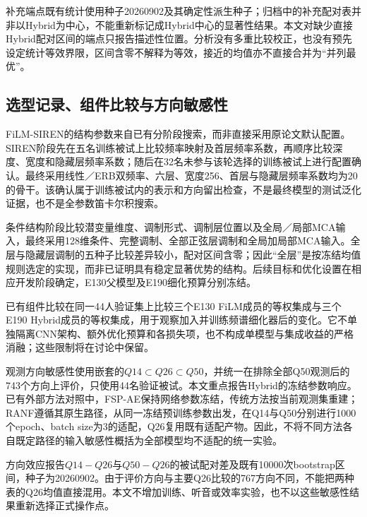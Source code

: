 补充端点既有统计使用种子20260902及其确定性派生种子；归档中的补充配对表并非以Hybrid为中心，不能重新标记成Hybrid中心的显著性结果。本文对缺少直接Hybrid配对区间的端点只报告描述性位置。分析没有多重比较校正，也没有预先设定统计等效界限，区间含零不解释为等效，接近的均值亦不直接合并为“并列最优”。

\subsection{选型记录、组件比较与方向敏感性}
FiLM-SIREN的结构参数来自已有分阶段搜索，而非直接采用原论文默认配置。SIREN阶段先在五名训练被试上比较频率映射及首层频率系数，再顺序比较深度、宽度和隐藏层频率系数；随后在32名未参与该轮选择的训练被试上进行配置确认。最终采用线性／ERB双频率、六层、宽度256、首层与隐藏层频率系数均为20的骨干。该确认属于训练被试内的表示和方向留出检查，不是最终模型的测试泛化证据，也不是全参数笛卡尔积搜索。

条件结构阶段比较潜变量维度、调制形式、调制层位置以及全局／局部MCA输入，最终采用128维条件、完整调制、全部正弦层调制和全局加局部MCA输入。全层与隐藏层调制的五种子比较差异较小，配对区间含零；因此“全层”是按冻结均值规则选定的实现，而非已证明具有稳定显著优势的结构。后续目标和优化设置在相应开发阶段确定，E130父模型及E190细化预算分别冻结。

已有组件比较在同一44人验证集上比较三个E130 FiLM成员的等权集成与三个E190 Hybrid成员的等权集成，用于观察加入并训练频谱细化器后的变化。它不单独隔离CNN架构、额外优化预算和各损失项，也不构成单模型与集成收益的严格消融；这些限制将在讨论中保留。

观测方向敏感性使用嵌套的$Q14\subset Q26\subset Q50$，并统一在排除全部Q50观测后的743个方向上评价，只使用44名验证被试。本文重点报告Hybrid的冻结参数响应。已有外部方法对照中，FSP-AE保持网络参数冻结，传统方法按当前观测集重建；RANF遵循其原生路径，从同一冻结预训练参数出发，在Q14与Q50分别进行1000个epoch、batch size为3的适配，Q26复用既有适配产物。因此，不将不同方法各自既定路径的输入敏感性概括为全部模型均不适配的统一实验。

方向效应报告$Q14-Q26$与$Q50-Q26$的被试配对差及既有10000次bootstrap区间，种子为20260902。由于评价方向与主要Q26比较的767方向不同，不能把两种表的Q26均值直接混用。本文不增加训练、听音或效率实验，也不以这些敏感性结果重新选择正式操作点。
